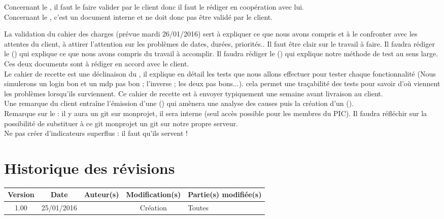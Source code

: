 \documentclass [a4paper] {article}
\begin{document}
Concernant le \PQCourt, il faut le faire valider par le client donc il faut le rédiger en coopération avec lui.
\\
Concernant le \PGCCourt, c'est un document interne et ne doit donc pas être validé par le client.

La validation du cahier des charges (prévue mardi 26/01/2016) sert à expliquer ce que nous avons compris et à le confronter avec les attentes du client, à attirer l'attention sur les problèmes de dates, durées, priorités.. Il faut être clair sur le travail à faire.
Il faudra rédiger le \DSE (\DSECourt) qui explique ce que nous avons compris du travail à accomplir. 
Il faudra rédiger le \PTV (\PTVCourt) qui explique notre méthode de test au sens large.
Ces deux documents sont à rédiger en accord avec le client.
\\
Le cahier de recette est une déclinaison du \PTVCourt, il explique en détail les tests que nous allons effectuer pour tester chaque fonctionnalité (Nous simulerons un login bon et un mdp pas bon ; l'inverse ; les deux pas bons...). cela permet une traçabilité des tests pour savoir d'où viennent les problèmes lorsqu'ils surviennent. Ce cahier de recette est à envoyer typiquement une semaine avant livraison au client.
\\
Une remarque du client entraîne l'émission d'une \FFT (\FFTCourt) qui amènera une analyse des causes puis la création d'un \OC (\OCCourt).
\\
Remarque sur le \PGCCourt : il y aura un git sur monprojet, il sera interne (seul accès possible pour les membres du PIC). Il faudra réfléchir sur la possibilité de substituer à ce git monprojet un git sur notre propre serveur.
\\
Ne pas créer d'indicateurs superflus : il faut qu'ils servent !

\newpage

\section*{Historique des révisions}
\begin{center}
			\begin{tabular}{| c | c | c | c | p{4cm} |}
				\hline
				\rowcolor{Gray}
				Version & Date & Auteur(s) & Modification(s) & Partie(s) modifiée(s)		 \\
				\hline
				1.00 & 25/01/2016 & \Pierre & Création & Toutes \\
		\hline		
			\end{tabular}
		\end{center}
\end{document}
